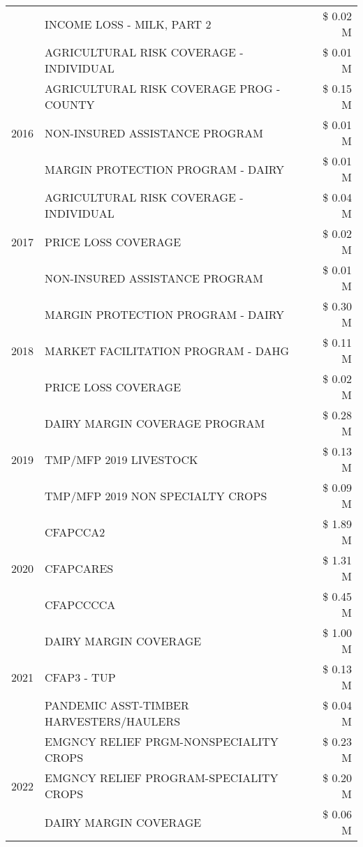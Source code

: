 \begin{tabular}{llr}
 & INCOME LOSS - MILK, PART 2 & \$ 0.02 M \\
 & AGRICULTURAL RISK COVERAGE - INDIVIDUAL & \$ 0.01 M \\
\cline{1-3}
\multirow[t]{3}{*}{2016} & AGRICULTURAL RISK COVERAGE PROG - COUNTY & \$ 0.15 M \\
 & NON-INSURED ASSISTANCE PROGRAM & \$ 0.01 M \\
 & MARGIN PROTECTION PROGRAM - DAIRY & \$ 0.01 M \\
\cline{1-3}
\multirow[t]{3}{*}{2017} & AGRICULTURAL RISK COVERAGE - INDIVIDUAL & \$ 0.04 M \\
 & PRICE LOSS COVERAGE & \$ 0.02 M \\
 & NON-INSURED ASSISTANCE PROGRAM & \$ 0.01 M \\
\cline{1-3}
\multirow[t]{3}{*}{2018} & MARGIN PROTECTION PROGRAM - DAIRY & \$ 0.30 M \\
 & MARKET FACILITATION PROGRAM - DAHG & \$ 0.11 M \\
 & PRICE LOSS COVERAGE & \$ 0.02 M \\
\cline{1-3}
\multirow[t]{3}{*}{2019} & DAIRY MARGIN COVERAGE PROGRAM & \$ 0.28 M \\
 & TMP/MFP 2019 LIVESTOCK & \$ 0.13 M \\
 & TMP/MFP 2019 NON SPECIALTY CROPS & \$ 0.09 M \\
\cline{1-3}
\multirow[t]{3}{*}{2020} & CFAPCCA2 & \$ 1.89 M \\
 & CFAPCARES & \$ 1.31 M \\
 & CFAPCCCCA & \$ 0.45 M \\
\cline{1-3}
\multirow[t]{3}{*}{2021} & DAIRY MARGIN COVERAGE & \$ 1.00 M \\
 & CFAP3 - TUP & \$ 0.13 M \\
 & PANDEMIC ASST-TIMBER HARVESTERS/HAULERS & \$ 0.04 M \\
\cline{1-3}
\multirow[t]{3}{*}{2022} & EMGNCY RELIEF PRGM-NONSPECIALITY CROPS & \$ 0.23 M \\
 & EMGNCY RELIEF PROGRAM-SPECIALITY CROPS & \$ 0.20 M \\
 & DAIRY MARGIN COVERAGE & \$ 0.06 M \\
\cline{1-3}
\bottomrule
\end{tabular}
